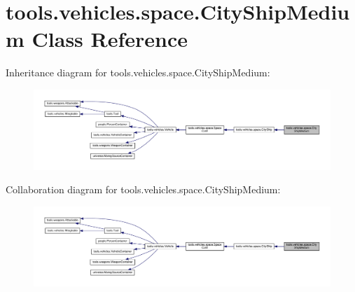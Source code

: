 \hypertarget{classtools_1_1vehicles_1_1space_1_1_city_ship_medium}{}\section{tools.\+vehicles.\+space.\+City\+Ship\+Medium Class Reference}
\label{classtools_1_1vehicles_1_1space_1_1_city_ship_medium}


Inheritance diagram for tools.\+vehicles.\+space.\+City\+Ship\+Medium\+:
\nopagebreak
\begin{figure}[H]
\begin{center}
\leavevmode
\includegraphics[width=350pt]{classtools_1_1vehicles_1_1space_1_1_city_ship_medium__inherit__graph}
\end{center}
\end{figure}


Collaboration diagram for tools.\+vehicles.\+space.\+City\+Ship\+Medium\+:
\nopagebreak
\begin{figure}[H]
\begin{center}
\leavevmode
\includegraphics[width=350pt]{classtools_1_1vehicles_1_1space_1_1_city_ship_medium__coll__graph}
\end{center}
\end{figure}
